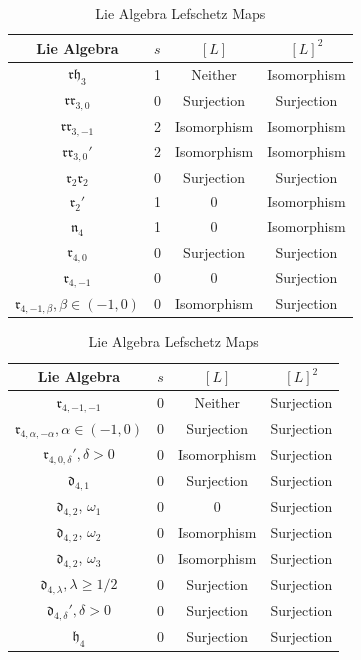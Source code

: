 \documentclass{amsart}
\theoremstyle{definition}
\begin{document}
\begin{table}[h]
\centering
\begin{minipage}{0.48\textwidth}
\centering
\begin{tabular}{|c|c|c|c|}
\hline
Lie Algebra & $s$ & $[L]$ & $[L]^2$ \\ \hline
$\mathfrak{rh}_3$ & 1 & Neither & Isomorphism\\ \hline
$\mathfrak{rr}_{3,0}$ &0  & Surjection & Surjection\\ \hline
$\mathfrak{rr}_{3,-1}$ & 2  & Isomorphism & Isomorphism \\ \hline
$\mathfrak{rr}_{3,0}'$ & 2 & Isomorphism & Isomorphism\\ \hline
$\mathfrak{r}_2\mathfrak{r}_2$ & 0  & Surjection & Surjection\\ \hline
$\mathfrak{r}_2'$ & 1 & 0 & Isomorphism\\ \hline
$\mathfrak{n}_4$ & 1 & 0 & Isomorphism \\ \hline
$\mathfrak{r}_{4,0}$ & 0 & Surjection & Surjection \\ \hline
$\mathfrak{r}_{4,-1}$ & 0 & 0 & Surjection\\ \hline
$\mathfrak{r}_{4,-1,\beta}, \beta \in (-1,0)$ & 0  & Isomorphism & Surjection \\ \hline
\end{tabular}
\end{minipage}\hfill%
\begin{minipage}{0.48\textwidth}
\centering
\begin{tabular}{|c|c|c|c|}
\hline
Lie Algebra & $s$ & $[L]$ & $[L]^2$ \\ \hline
$\mathfrak{r}_{4,-1,-1}$ & 0 & Neither & Surjection\\ \hline
$\mathfrak{r}_{4,\alpha, - \alpha}, \alpha \in (-1,0)$&0 & Surjection & Surjection  \\ \hline
$\mathfrak{r}_{4,0,\delta}', \delta >0$ &0  & Isomorphism & Surjection \\ \hline
$\mathfrak{d}_{4,1}$ & 0 & Surjection & Surjection\\ \hline
$\mathfrak{d}_{4,2}$, $\omega_1$ & 0  & 0 & Surjection\\ \hline
$\mathfrak{d}_{4,2}$, $\omega_2$ & 0  & Isomorphism & Surjection\\ \hline
$\mathfrak{d}_{4,2}$, $\omega_3$ & 0  & Isomorphism & Surjection \\ \hline
$\mathfrak{d}_{4,\lambda}, \lambda \geq 1/2$ & 0 & Surjection & Surjection \\ \hline
$\mathfrak{d}_{4,\delta}', \delta >0$ & 0 & Surjection & Surjection \\ \hline
$\mathfrak{h}_4$ & 0  & Surjection & Surjection \\ \hline
\end{tabular}
\end{minipage}

\caption{Lie Algebra Lefschetz Maps}
\end{table}
\end{document}
